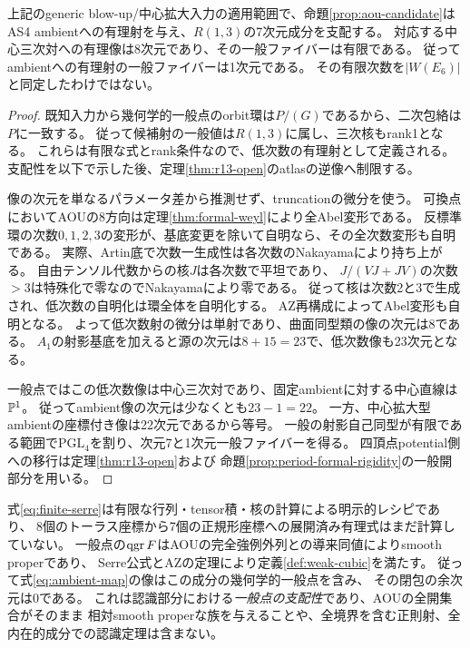 \begin{theorem}[一般AOU点からのambientの像]\label{thm:aou-dominance}
上記のgeneric blow-up/中心拡大入力の適用範囲で、命題\ref{prop:aou-candidate}は
AS4 ambientへの有理射を与え、$R(1,3)$の7次元成分を支配する。
対応する中心三次対への有理像は8次元であり、その一般ファイバーは有限である。
従ってambientへの有理射の一般ファイバーは1次元である。
その有限次数を$|W(E_6)|$と同定したわけではない。
\end{theorem}
\begin{proof}
既知入力から幾何学的一般点のorbit環は$P/(G)$であるから、二次包絡は$P$に一致する。
従って候補射の一般値は$R(1,3)$に属し、三次核もrank1となる。
これらは有限な式とrank条件なので、低次数の有理射として定義される。
支配性を以下で示した後、定理\ref{thm:r13-open}のatlasの逆像へ制限する。

像の次元を単なるパラメータ差から推測せず、truncationの微分を使う。
可換点においてAOUの8方向は定理\ref{thm:formal-weyl}により全Abel変形である。
反標準環の次数$0,1,2,3$の変形が、基底変更を除いて自明なら、その全次数変形も自明である。
実際、Artin底で次数一生成性は各次数のNakayamaにより持ち上がる。
自由テンソル代数からの核$J$は各次数で平坦であり、
$J/(VJ+JV)$の次数$>3$は特殊化で零なのでNakayamaにより零である。
従って核は次数2と3で生成され、低次数の自明化は環全体を自明化する。
AZ再構成によってAbel変形も自明となる。
よって低次数射の微分は単射であり、曲面同型類の像の次元は8である。
$A_1$の射影基底を加えると源の次元は$8+15=23$で、低次数像も23次元となる。

一般点ではこの低次数像は中心三次対であり、固定ambientに対する中心直線は$\mathbb P^1$。
従ってambient像の次元は少なくとも$23-1=22$。
一方、中心拡大型ambientの座標付き像は22次元であるから等号。
一般の射影自己同型が有限である範囲で$\mathrm{PGL}_4$を割り、次元7と1次元一般ファイバーを得る。
四頂点potential側への移行は定理\ref{thm:r13-open}および
命題\ref{prop:period-formal-rigidity}の一般開部分を用いる。
\end{proof}

\begin{remark}[有理射と弱い対象の全域の射]
式\eqref{eq:finite-serre}は有限な行列・tensor積・核の計算による明示的レシピであり、
8個のトーラス座標から7個の正規形座標への展開済み有理式はまだ計算していない。
一般点の$\operatorname{qgr} F$はAOUの完全強例外列との導来同値によりsmooth properであり、
Serre公式とAZの定理により定義\ref{def:weak-cubic}を満たす。
従って式\eqref{eq:ambient-map}の像はこの成分の幾何学的一般点を含み、
その閉包の余次元は0である。
これは認識部分における\emph{一般点の支配性}であり、AOUの全開集合がそのまま
相対smooth properな族を与えることや、全境界を含む正則射、全内在的成分での認識定理は含まない。
\end{remark}
